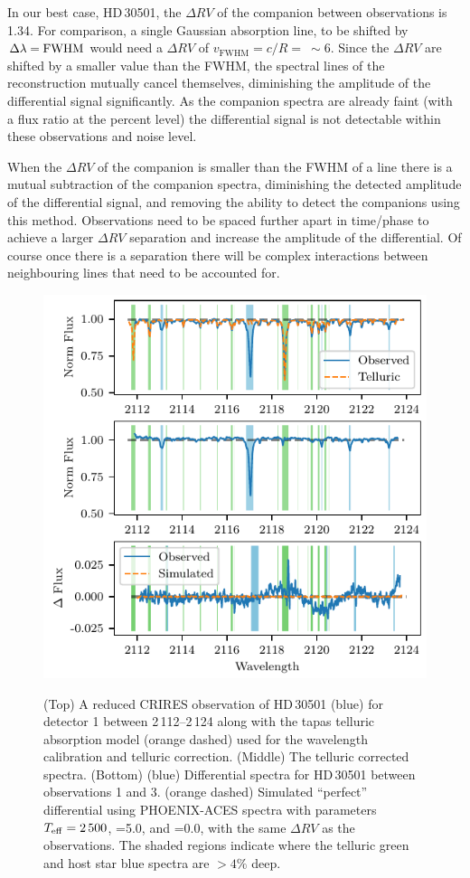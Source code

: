 In our best case, {HD\,30501}, the \(\Delta {RV}\) of the companion between observations is 1.34\kmps{}. For comparison, a single Gaussian absorption line, to be shifted by \(\Delta\lambda = \rm {FWHM}\) would need a \(\Delta {RV}\) of \(v_{\textrm{FWHM}} = c/R =~\sim6\)\kmps{}. Since the \(\Delta {RV}\) are shifted by a smaller value than the {FWHM}, the spectral lines of the reconstruction mutually cancel themselves, diminishing the amplitude of the differential signal significantly. As the companion spectra are already faint (with a flux ratio at the percent level) the differential signal is not detectable within these observations and noise level.

When the \(\Delta {RV}\) of the companion is smaller than the {FWHM} of a line there is a mutual subtraction of the companion spectra, diminishing the detected amplitude of the differential signal, and removing the ability to detect the companions using this method. Observations need to be spaced further apart in time/phase to achieve a larger \(\Delta {RV}\) separation and increase the amplitude of the differential. Of course once there is a separation there will be complex interactions between neighbouring lines that need to be accounted for.


\begin{figure}
    \centering
    \includegraphics[width=0.8\hsize]{figures/direct-recovery/differential.pdf}\\
    \caption{(Top) A reduced {CRIRES} observation of {HD\,30501} (blue) for detector 1 between 2\,112--2\,124\nm{} along with the tapas telluric absorption model ({orange} dashed) used for the wavelength calibration and telluric correction. (Middle) The telluric corrected spectra. (Bottom) ({blue}) Differential spectra for {HD\,30501} between observations 1 and 3. ({orange} dashed) Simulated ``perfect'' differential using {PHOENIX-ACES} spectra with parameters \(T_{\mathrm{eff}}{}=2\,500\)\K{}, \logg{}=5.0, and \feh{}=0.0, with the same \(\Delta {RV}\) as the observations. The shaded regions indicate where the telluric {green} and host star {blue} spectra are \(> 4\%\) deep.}
    \label{fig:spectral_example}
\end{figure}


